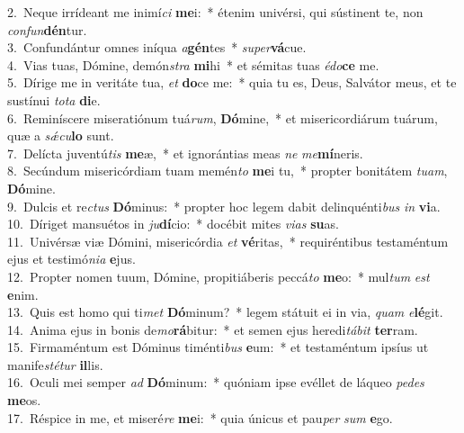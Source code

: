 {2.~}Neque irrídeant me inimí\textit{ci} \textbf{me}i:~* étenim univérsi, qui sústinent te, non \textit{con}\textit{fun}\textbf{dén}tur.\\
{3.~}Confundántur omnes iníqua \textit{a}\textbf{gén}tes~* \textit{su}\textit{per}\textbf{vá}cue.\\
{4.~}Vias tuas, Dómine, demón\textit{stra} \textbf{mi}hi~* et sémitas tuas \textit{é}\textit{do}\textbf{ce} me.\\
{5.~}Dírige me in veritáte tua, \textit{et} \textbf{do}ce me:~* quia tu es, Deus, Salvátor meus, et te sustínui \textit{to}\textit{ta} \textbf{di}e.\\
{6.~}Reminíscere miseratiónum tuá\textit{rum}, \textbf{Dó}mine,~* et misericordiárum tuárum, quæ a \textit{sǽ}\textit{cu}\textbf{lo} sunt.\\
{7.~}Delícta juventú\textit{tis} \textbf{me}æ,~* et ignorántias meas \textit{ne} \textit{me}\textbf{mí}neris.\\
{8.~}Secúndum misericórdiam tuam memén\textit{to} \textbf{me}i tu,~* propter bonitátem \textit{tu}\textit{am}, \textbf{Dó}mine.\\
{9.~}Dulcis et re\textit{ctus} \textbf{Dó}minus:~* propter hoc legem dabit delinquénti\textit{bus} \textit{in} \textbf{vi}a.\\
{10.~}Díriget mansuétos in \textit{ju}\textbf{dí}cio:~* docébit mites \textit{vi}\textit{as} \textbf{su}as.\\
{11.~}Univérsæ viæ Dómini, misericórdia \textit{et} \textbf{vé}ritas,~* requiréntibus testaméntum ejus et testimó\textit{ni}\textit{a} \textbf{e}jus.\\
{12.~}Propter nomen tuum, Dómine, propitiáberis peccá\textit{to} \textbf{me}o:~* mul\textit{tum} \textit{est} \textbf{e}nim.\\
{13.~}Quis est homo qui ti\textit{met} \textbf{Dó}minum?~* legem státuit ei in via, \textit{quam} \textit{e}\textbf{lé}git.\\
{14.~}Anima ejus in bonis de\textit{mo}\textbf{rá}bitur:~* et semen ejus heredi\textit{tá}\textit{bit} \textbf{ter}ram.\\
{15.~}Firmaméntum est Dóminus timénti\textit{bus} \textbf{e}um:~* et testaméntum ipsíus ut manife\textit{sté}\textit{tur} \textbf{il}lis.\\
{16.~}Oculi mei semper \textit{ad} \textbf{Dó}minum:~* quóniam ipse evéllet de láqueo \textit{pe}\textit{des} \textbf{me}os.\\
{17.~}Réspice in me, et miseré\textit{re} \textbf{me}i:~* quia únicus et pau\textit{per} \textit{sum} \textbf{e}go.\\
